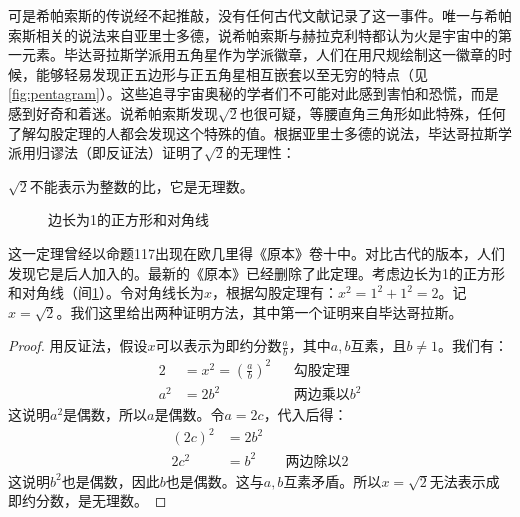 \documentclass[b5paper]{ctexart}
\begin{document}
可是希帕索斯的传说经不起推敲，没有任何古代文献记录了这一事件。唯一与希帕索斯相关的说法来自亚里士多德，说希帕索斯与赫拉克利特都认为火是宇宙中的第一元素。毕达哥拉斯学派用五角星作为学派徽章，人们在用尺规绘制这一徽章的时候，能够轻易发现正五边形与正五角星相互嵌套以至无穷的特点（见\cref{fig:pentagram}）。这些追寻宇宙奥秘的学者们不可能对此感到害怕和恐慌，而是感到好奇和着迷。说希帕索斯发现$\sqrt{2}$也很可疑，等腰直角三角形如此特殊，任何了解勾股定理的人都会发现这个特殊的值。根据亚里士多德的说法，毕达哥拉斯学派用归谬法（即反证法）证明了$\sqrt{2}$的无理性：

\begin{theorem}[毕达哥拉斯]
$\sqrt{2}$不能表示为整数的比，它是无理数。
\end{theorem}

\begin{figure}[htbp]
  \centering
  \caption{边长为1的正方形和对角线}
  \label{fig:square-diagonal}
\end{figure}

这一定理曾经以命题117出现在欧几里得《原本》卷十中。对比古代的版本，人们发现它是后人加入的。最新的《原本》已经删除了此定理。考虑边长为1的正方形和对角线（间\cref{fig:square-diagonal}）。令对角线长为$x$，根据勾股定理有：$x^2 = 1^2 + 1^2 = 2$。记$x = \sqrt{2}$。我们这里给出两种证明方法，其中第一个证明来自毕达哥拉斯。

\begin{proof}
用反证法，假设$x$可以表示为即约分数$\frac{a}{b}$，其中$a, b$互素，且$b \ne 1$。我们有：
\begin{align*}
2 &= x^2 = (\frac{a}{b})^2  && \text{勾股定理} \\
a^2 &= 2b^2  && \text{两边乘以}b^2
\end{align*}
这说明$a^2$是偶数，所以$a$是偶数。令$a = 2c$，代入后得：
\begin{align*}
(2c)^2 &= 2b^2 \\
2c^2 &= b^2 && \text{两边除以}2
\end{align*}
这说明$b^2$也是偶数，因此$b$也是偶数。这与$a, b$互素矛盾。所以$x = \sqrt{2}$无法表示成即约分数，是无理数。
\end{proof}
\end{document}

